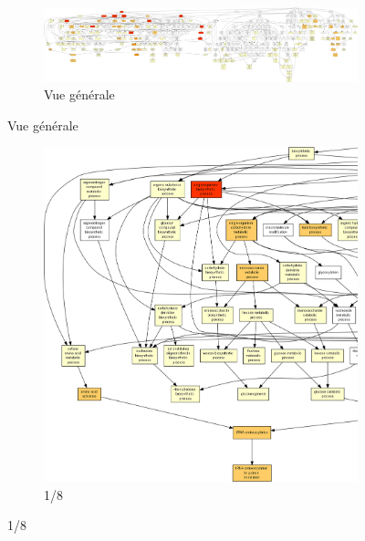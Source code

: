\begin{figure}
\begin{subfigure}{\textwidth}
\includegraphics[width=\textwidth]
{Figures/hlc-go-all-graph/hlc-go-all-graph.png}
\caption{Vue générale}
\end{subfigure}
\end{figure}

\begin{figure}[p]
\begin{subfigure}{\textwidth}
\includegraphics[width=\textwidth]
{Figures/hlc-go-all-graph/hlc-go-all-graph_0.png}
\caption{1/8}
\end{subfigure}
\end{figure}

